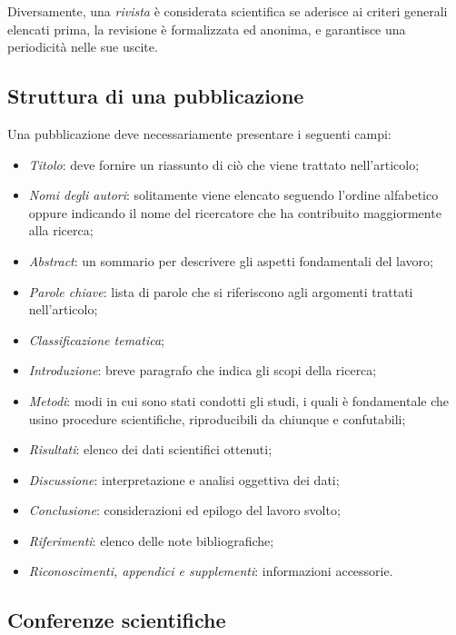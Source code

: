 Diversamente, una \textit{rivista} è considerata scientifica se aderisce ai criteri
generali elencati prima, la revisione è formalizzata ed anonima, e garantisce una
periodicità nelle sue uscite.

\subsection{Struttura di una pubblicazione}

Una pubblicazione deve necessariamente presentare i seguenti campi:
\begin{itemize}
    \item \textit{Titolo}: deve fornire un riassunto di ciò che viene trattato
    nell'articolo;
    \item \textit{Nomi degli autori}: solitamente viene elencato seguendo
    l'ordine alfabetico oppure indicando il nome del ricercatore che ha
    contribuito maggiormente alla ricerca;
    \item \textit{Abstract}: un sommario per descrivere gli aspetti fondamentali
    del lavoro;
    \item \textit{Parole chiave}: lista di parole che si riferiscono agli
    argomenti trattati nell'articolo;
    \item \textit{Classificazione tematica};
    \item \textit{Introduzione}: breve paragrafo che indica gli scopi della ricerca;
    \item \textit{Metodi}: modi in cui sono stati condotti gli studi, i quali
    è fondamentale che usino procedure scientifiche, riproducibili da chiunque
    e confutabili;
    \item \textit{Risultati}: elenco dei dati scientifici ottenuti;
    \item \textit{Discussione}: interpretazione e analisi oggettiva dei dati;
    \item \textit{Conclusione}: considerazioni ed epilogo del lavoro svolto;
    \item \textit{Riferimenti}: elenco delle note bibliografiche;
    \item \textit{Riconoscimenti, appendici e supplementi}: informazioni accessorie.
\end{itemize}

\subsection{Conferenze scientifiche}\label{sec:conferenze}

